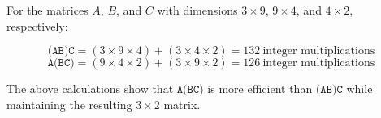 \documentclass[11pt]{article}
\begin{document}
For the matrices $A$, $B$, and $C$ with dimensions $3 \times 9$, $9 \times 4$, and $4 \times 2$, respectively:

\[\texttt{(AB)C} = (3 \times 9 \times 4) + (3 \times 4 \times 2) = 132 \ \text{integer multiplications}\]
\[\texttt{A(BC)} = (9 \times 4 \times 2) + (3 \times 9 \times 2) = 126 \ \text{integer multiplications}\]

The above calculations show that $\texttt{A(BC)}$ is more efficient than $\texttt{(AB)C}$ while maintaining the resulting $3 \times 2$ matrix.
\end{document}
